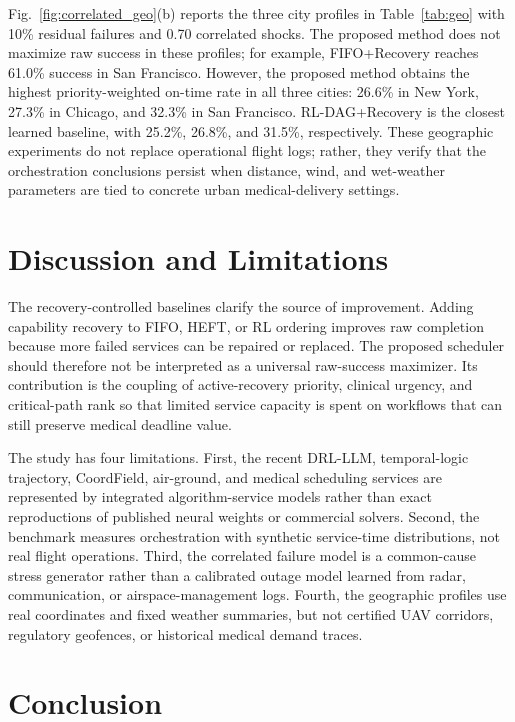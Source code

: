 \documentclass[conference]{IEEEtran}
\begin{document}
Fig.~\ref{fig:correlated_geo}(b) reports the three city profiles in
Table~\ref{tab:geo} with 10\% residual failures and 0.70 correlated shocks.
The proposed method does not maximize raw success in these profiles; for
example, FIFO+Recovery reaches 61.0\% success in San Francisco. However, the
proposed method obtains the highest priority-weighted on-time rate in all
three cities: 26.6\% in New York, 27.3\% in Chicago, and 32.3\% in San
Francisco. RL-DAG+Recovery is the closest learned baseline, with 25.2\%,
26.8\%, and 31.5\%, respectively.
These geographic experiments do not replace operational flight logs; rather,
they verify that the orchestration conclusions persist when distance, wind,
and wet-weather parameters are tied to concrete urban medical-delivery
settings.

\section{Discussion and Limitations}

The recovery-controlled baselines clarify the source of improvement. Adding
capability recovery to FIFO, HEFT, or RL ordering improves raw completion
because more failed services can be repaired or replaced. The proposed
scheduler should therefore not be interpreted as a universal raw-success
maximizer. Its contribution is the coupling of active-recovery priority,
clinical urgency, and critical-path rank so that limited service capacity is
spent on workflows that can still preserve medical deadline value.

The study has four limitations. First, the recent DRL-LLM, temporal-logic
trajectory, CoordField, air-ground, and medical scheduling services are
represented by integrated algorithm-service models rather than exact
reproductions of published neural weights or commercial solvers. Second, the
benchmark measures orchestration with synthetic service-time distributions,
not real flight operations. Third, the correlated failure model is a
common-cause stress generator rather than a calibrated outage model learned
from radar, communication, or airspace-management logs. Fourth, the
geographic profiles use real coordinates and fixed weather summaries, but
not certified UAV corridors, regulatory geofences, or historical medical
demand traces.


\section{Conclusion}
\end{document}
